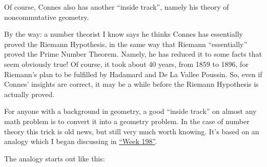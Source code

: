 \documentclass{article}
\renewcommand{\texttt}[1]{%
  \begingroup
  \ttfamily
  \begingroup\lccode`~=`/\lowercase{\endgroup\def~}{/\discretionary{}{}{}}%
  \begingroup\lccode`~=`[\lowercase{\endgroup\def~}{[\discretionary{}{}{}}%
  \begingroup\lccode`~=`.\lowercase{\endgroup\def~}{.\discretionary{}{}{}}%
  \catcode`/=\active\catcode`[=\active\catcode`.=\active
  \scantokens{#1\noexpand}%
  \endgroup
}
\begin{document}

Of course, Connes also has another ``inside track'', namely his theory
of noncommutative geometry.

By the way: a number theorist I know says he thinks Connes has
essentially proved the Riemann Hypothesis, in the same way that Riemann
``essentially'' proved the Prime Number Theorem. Namely, he has reduced
it to some facts that seem obviously true! Of course, it took about 40
years, from 1859 to 1896, for Riemann's plan to be fulfilled by Hadamard
and De La Vallee Poussin. So, even if Connes' insights are correct, it
may be a while before the Riemann Hypothesis is actually proved.

For anyone with a background in geometry, a good ``inside track'' on
almost any math problem is to convert it into a geometry problem. In the
case of number theory this trick is old news, but still very much worth
knowing. It's based on an analogy which I began discussing in
\protect\hyperlink{week198}{``Week 198''}.

The analogy starts out like this:
\end{document}
